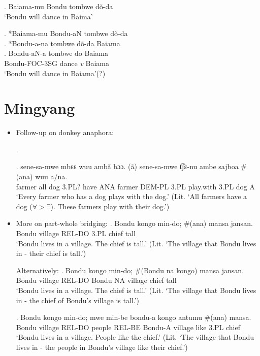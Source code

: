 \documentclass{assets/fieldnotes}
\begin{document}
\exg. Baiama-mu Bondu tombwe dõ-da\\
`Bondu will dance in Baima'

\ex. *Baiama-mu Bondu-aN tombwe dõ-da\\

\ex. *Bondu-a-na tombwe dõ-da Baiama\\

\ex. Bondu-aN-a tombwe do Baiama\\
Bondu-FOC-3SG dance \textit{v} Baiama\\
`Bondu will dance in Baiama'(?)

\section{Mingyang}
\begin{itemize}
    \item Follow-up on donkey anaphora:

    .
    
    \exg. sene-sa-mwe mbɛɛ wuu ambã bɔɔ. (ã) sene-sa-mwe t͡ʃɛ-nu ambe sajboa \#(ana) wuu a/na.\\
    farmer all dog 3.PL? have ANA farmer DEM-PL 3.PL play.with 3.PL dog A\\
    `Every farmer who has a dog plays with the dog.' (Lit. `All farmers have a dog ($\forall > \exists$). These farmers play with their dog.')

    \item More on part-whole bridging:
    \exg. Bondu kongo min-do; \#(ana) mansa jansan.\\
    Bondu village REL-DO 3.PL chief tall\\
    `Bondu lives in a village. The chief is tall.' (Lit. `The village that Bondu lives in - their chief is tall.')

    
Alternatively:
\exg. Bondu kongo min-do; \#(Bondu na kongo) mansa jansan.\\
    Bondu village REL-DO Bondu NA village chief tall\\
    `Bondu lives in a village. The chief is tall.' (Lit. `The village that Bondu lives in - the chief of Bondu's village is tall.')

\exg. Bondu kongo min-do; mwe min-be bondu-a kongo antumu \#(ana) mansa.\\
    Bondu village REL-DO people REL-BE Bondu-A village like 3.PL chief\\
    `Bondu lives in a village. People like the chief.' (Lit. `The village that Bondu lives in - the people in Bondu's village like their chief.')


\end{itemize}
\end{document}
